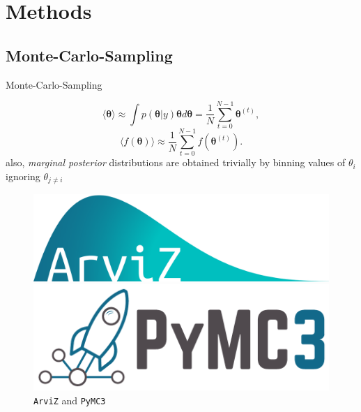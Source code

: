 \documentclass[11pt,aspectratio=1610,dvipsnames]{beamer}
\begin{document}
\section{Methods}

\subsection{Monte-Carlo-Sampling}
\begin{frame}{Monte-Carlo-Sampling}
	\begin{minipage}{\linewidth}
		\begin{minipage}{0.6\linewidth}
			\begin{tcolorbox}[colback=black!5,colframe=gray!15!black,title={Benefits of Monte-Carlo-Sampling}] 
				 \begin{equation}
					\langle \boldsymbol{\theta}\rangle\approx \int p(\boldsymbol{\theta} | y)\boldsymbol{\theta}d\boldsymbol{\theta}=\frac{1}{N}\sum_{t=0}^{N-1}\boldsymbol{\theta}^{(t)},
				\end{equation}
				 \begin{equation}
					\langle f(\boldsymbol{\theta})\rangle\approx\frac{1}{N}\sum_{t=0}^{N-1}f(\boldsymbol{\theta}^{(t)}).
				\end{equation}
				also, \emph{marginal posterior} distributions are obtained trivially by binning values of $\theta_i$ ignoring $\theta_{j\neq i}$
			\end{tcolorbox}
		\end{minipage}
		\hfill
		\begin{minipage}{0.3\linewidth}
			\begin{figure}
				\includegraphics[width=\linewidth]{arviz_logo}
				\vspace{0.1cm}
				
				\includegraphics[width=\linewidth]{PyMC3_banner}
				\caption{\texttt{ArviZ} \cite{ArviZ} and \texttt{PyMC3} \cite{PyMC3}}
			\end{figure}
			
		\end{minipage}
	\end{minipage}
	
	
\end{frame}
\end{document}
